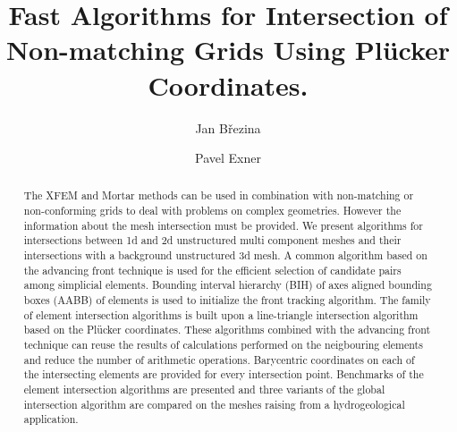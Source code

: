 \documentclass{elsarticle}
\newcommand{\plucker}{Pl\"{u}cker }
\begin{document}
\begin{frontmatter}



\title{Fast Algorithms for Intersection of Non-matching Grids Using \plucker Coordinates.}



\author[adr]{Jan B{\v r}ezina}

\author[adr]{Pavel Exner}

\address[adr]{Technical University of Liberec, Studentsk{\' a} 1402/2, 461 17 Liberec 1, Czech Republic}


\begin{abstract}
The XFEM and Mortar methods can be used in combination with non-matching or non-conforming grids 
to deal with problems on complex geometries. However the information about the mesh intersection must be provided.
We present algorithms for intersections between 1d and 2d unstructured multi component meshes 
and their intersections with a background unstructured 3d mesh. A common algorithm 
based on the advancing front technique is used for the efficient selection of candidate pairs among 
simplicial elements. Bounding interval hierarchy (BIH) of axes aligned bounding boxes (AABB) of elements
is used to initialize the front tracking algorithm. The family of element intersection algorithms
is built upon a line-triangle intersection algorithm based on the \plucker
coordinates. These algorithms combined with the advancing front technique can reuse the results of calculations 
performed on the neigbouring elements and reduce the number of arithmetic operations. Barycentric coordinates
on each of the intersecting elements are provided for every intersection point. Benchmarks 
of the element intersection algorithms are presented and three variants of the global intersection 
algorithm are compared on the meshes raising from a hydrogeological application.
\end{abstract}


\end{frontmatter}
\end{document}
